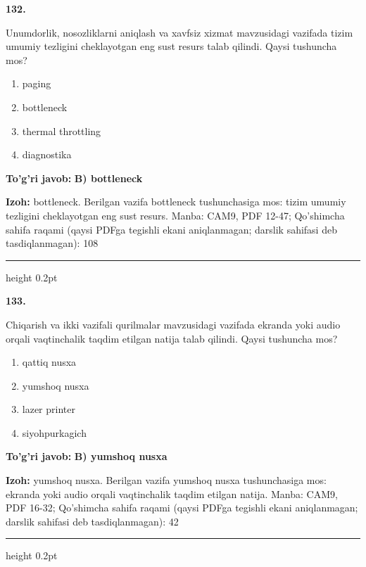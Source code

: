 \documentclass[10pt,a4paper]{article}
\begin{document}
{\bfseries\sffamily\color{ink} 132.}
\par
Unumdorlik, nosozliklarni aniqlash va xavfsiz xizmat mavzusidagi vazifada tizim umumiy tezligini cheklayotgan eng sust resurs talab qilindi. Qaysi tushuncha mos?
\begin{enumerate}[label=\Alph*),leftmargin=9mm]
\item paging
\item bottleneck
\item thermal throttling
\item diagnostika
\end{enumerate}
\begin{tcolorbox}[enhanced,breakable,colback=teal!4,colframe=teal!60!black,boxrule=0.45pt,arc=1.2mm,left=2.7mm,right=2.7mm,top=1.8mm,bottom=1.8mm,before skip=2mm,after skip=2mm]
{\bfseries\sffamily\color{teal}To'g'ri javob:} \textbf{B) bottleneck}
\par\smallskip
{\bfseries Izoh:} bottleneck. Berilgan vazifa bottleneck tushunchasiga mos: tizim umumiy tezligini cheklayotgan eng sust resurs. Manba: CAM9, PDF 12-47; Qo'shimcha sahifa raqami (qaysi PDFga tegishli ekani aniqlanmagan; darslik sahifasi deb tasdiqlanmagan): 108
\end{tcolorbox}
\vspace{2mm}\hrule height 0.2pt\vspace{3mm}

{\bfseries\sffamily\color{ink} 133.}
\par
Chiqarish va ikki vazifali qurilmalar mavzusidagi vazifada ekranda yoki audio orqali vaqtinchalik taqdim etilgan natija talab qilindi. Qaysi tushuncha mos?
\begin{enumerate}[label=\Alph*),leftmargin=9mm]
\item qattiq nusxa
\item yumshoq nusxa
\item lazer printer
\item siyohpurkagich
\end{enumerate}
\begin{tcolorbox}[enhanced,breakable,colback=teal!4,colframe=teal!60!black,boxrule=0.45pt,arc=1.2mm,left=2.7mm,right=2.7mm,top=1.8mm,bottom=1.8mm,before skip=2mm,after skip=2mm]
{\bfseries\sffamily\color{teal}To'g'ri javob:} \textbf{B) yumshoq nusxa}
\par\smallskip
{\bfseries Izoh:} yumshoq nusxa. Berilgan vazifa yumshoq nusxa tushunchasiga mos: ekranda yoki audio orqali vaqtinchalik taqdim etilgan natija. Manba: CAM9, PDF 16-32; Qo'shimcha sahifa raqami (qaysi PDFga tegishli ekani aniqlanmagan; darslik sahifasi deb tasdiqlanmagan): 42
\end{tcolorbox}
\vspace{2mm}\hrule height 0.2pt\vspace{3mm}
\end{document}
